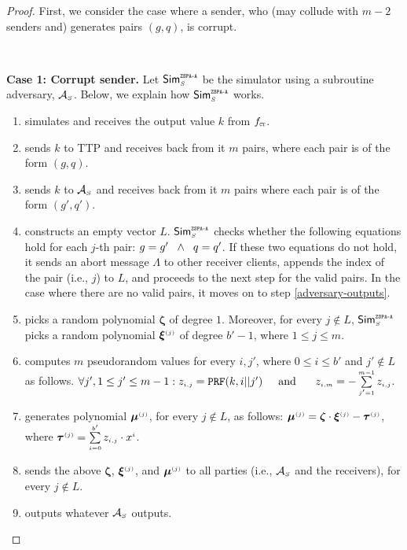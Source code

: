 \begin{proof}
First, we consider the case where a sender, who (may collude with $m-2$ senders and) generates pairs $(g,q)$, is corrupt. 

\

\noindent\textbf{Case 1: Corrupt sender.}  Let $\mathsf{Sim}^{\scriptscriptstyle \mathtt{ZSPA\text{-}A}}_{\scriptscriptstyle S}$ be the simulator using a subroutine adversary, $\mathcal{A}_{\scriptscriptstyle S}$. Below, we explain how $\mathsf{Sim}^{\scriptscriptstyle \mathtt{ZSPA\text{-}A}}_{\scriptscriptstyle S}$ works.  


\begin{enumerate}
%
\item simulates  \ct  and receives the output value $ k$ from $f_{\scriptscriptstyle \mathtt{CT}}$.
%
\item sends $ k$ to TTP and receives back from it $m$ pairs, where each pair is of the form $( g,  q)$. 
%
\item sends $ k$ to $\mathcal{A}_{\scriptscriptstyle S}$ and receives back from it $m$ pairs  where each pair is of the form $( g',  q')$. 
%

\item constructs an empty vector $ L$. $\mathsf{Sim}^{\scriptscriptstyle \mathtt{ZSPA\text{-}A}}_{\scriptscriptstyle S}$ checks whether the following equations hold for each $j$-th pair: $ g= g' \hspace{2mm} \wedge  \hspace{2mm}  q= q'$. If these two equations do not hold, it sends an abort message $\Lambda$ to other receiver clients, appends the index of the pair (i.e., $j$) to $ L$, and proceeds to the next step for the valid pairs. In the case where there are no valid pairs, it moves on to step \ref{adversary-outputs}. 
%
\item picks a random polynomial ${\bm \zeta}$ of degree $1$. Moreover, for every $j\notin  L$, $\mathsf{Sim}^{\scriptscriptstyle \mathtt{ZSPA\text{-}A}}_{\scriptscriptstyle S}$ picks a random polynomial ${\bm\xi}^{\scriptscriptstyle (j)}$ of degree $b'-1$, where $1\leq j \leq m$.
%

\item computes $m$ pseudorandom values  for every $i,j'$, where $0\leq i \leq b'$ and $j'\notin  L$ as follows.   
%
$\forall j', 1\leq j' \leq m-1: z_{\scriptscriptstyle i,j}=\mathtt{PRF}( k,i||j')\hspace{5mm}  \text{and }\hspace{5mm} z_{\scriptscriptstyle i,m}=-\sum\limits^{\scriptscriptstyle m-1}_{\scriptscriptstyle j'=1}z_{\scriptscriptstyle i,j}$.
%
 \item generates polynomial ${\bm\mu}^{\scriptscriptstyle (j)}$, for every $j \notin L$, as follows:
   ${\bm\mu}^{\scriptscriptstyle (j)} = {\bm\zeta}\cdot {\bm\xi}^{\scriptscriptstyle (j)}-\bm\tau^{\scriptscriptstyle (j)}$, where ${\bm\tau}^{\scriptscriptstyle (j)}=\sum\limits^{\scriptscriptstyle b'}_{\scriptscriptstyle i=0}z_{\scriptscriptstyle i,j}\cdot x^{\scriptscriptstyle i}$.
%
\item sends the above ${\bm \zeta}$,  ${\bm\xi}^{\scriptscriptstyle (j)}$, and ${\bm\mu}^{\scriptscriptstyle (j)}$ to all parties (i.e., $\mathcal{A}_{\scriptscriptstyle S}$ and the receivers), for every $j\notin L$. 
%
\item\label{adversary-outputs} outputs whatever $\mathcal{A}_{\scriptscriptstyle S}$ outputs.
%
 \end{enumerate}


\end{proof}
